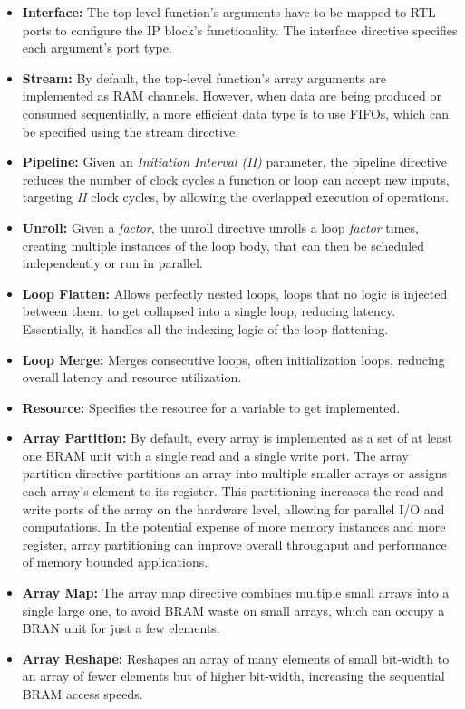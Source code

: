 \begin{itemize}
	\item \textbf{Interface:} The top-level function's arguments have to be mapped to RTL ports to configure the IP block's functionality. The interface directive specifies each argument's port type.
	\item \textbf{Stream:} By default, the top-level function's array arguments are implemented as RAM channels. However, when data are being produced or consumed sequentially, a more efficient data type is to use FIFOs, which can be specified using the stream directive.
	\item \textbf{Pipeline:} Given an \emph{Initiation Interval (II)} parameter, the pipeline directive reduces the number of clock cycles a function or loop can accept new inputs, targeting \emph{II} clock cycles, by allowing the overlapped execution of operations.
	\item \textbf{Unroll:} Given a \emph{factor}, the unroll directive unrolls a loop \emph{factor} times, creating multiple instances of the loop body, that can then be scheduled independently or run in parallel.
	\item \textbf{Loop Flatten:} Allows perfectly nested loops, loops that no logic is injected between them, to get collapsed into a single loop, reducing latency. Essentially, it handles all the indexing logic of the loop flattening.
	\item \textbf{Loop Merge:} Merges consecutive loops, often initialization loops, reducing overall latency and resource utilization.
	\item \textbf{Resource:} Specifies the resource for a variable to get implemented.
	\item \textbf{Array Partition:} By default, every array is implemented as a set of at least one BRAM unit with a single read and a single write port. The array partition directive partitions an array into multiple smaller arrays or assigns each array's element to its register. This partitioning increases the read and write ports of the array on the hardware level, allowing for parallel I/O and computations. In the potential expense of more memory instances and more register, array partitioning can improve overall throughput and performance of memory bounded applications.
	\item \textbf{Array Map:} The array map directive combines multiple small arrays into a single large one, to avoid BRAM waste on small arrays, which can occupy a BRAN unit for just a few elements.
	\item \textbf{Array Reshape:} Reshapes an array of many elements of small bit-width to an array of fewer elements but of higher bit-width, increasing the sequential BRAM access speeds.

\end{itemize}
